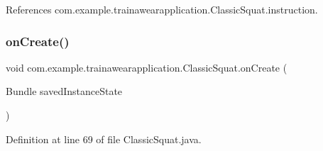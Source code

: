 References com.\+example.\+trainawearapplication.\+Classic\+Squat.\+instruction.

\mbox{\label{classcom_1_1example_1_1trainawearapplication_1_1_classic_squat_afa5582341ba5a9609e4eb7d539741e6a}} 
\subsubsection{\texorpdfstring{onCreate()}{onCreate()}}
{\footnotesize\ttfamily void com.\+example.\+trainawearapplication.\+Classic\+Squat.\+on\+Create (\begin{DoxyParamCaption}\item[{Bundle}]{saved\+Instance\+State }\end{DoxyParamCaption})\hspace{0.3cm}{\ttfamily [protected]}}



Definition at line 69 of file Classic\+Squat.\+java.


